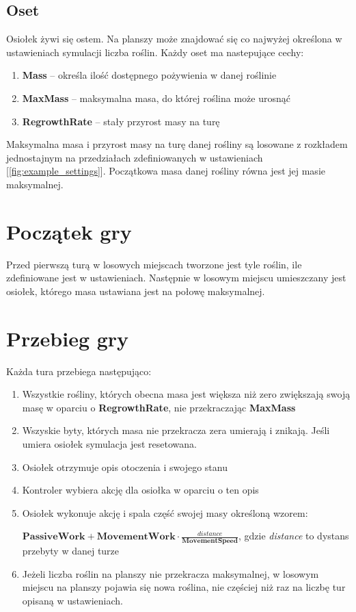 \subsection{Oset}
Osiołek żywi się ostem. Na planszy może znajdować się co najwyżej określona w ustawieniach symulacji liczba roślin. Każdy oset ma nastepujące cechy:
\begin{enumerate}    
    \item \textbf{Mass} -- określa ilość dostępnego pożywienia w danej roślinie
    \item \textbf{MaxMass} -- maksymalna masa, do której roślina może urosnąć
    \item \textbf{RegrowthRate} -- stały przyrost masy na turę
\end{enumerate}
Maksymalna masa i przyrost masy na turę danej rośliny są losowane z rozkładem jednostajnym na przedziałach zdefiniowanych w ustawieniach [\ref{fig:example_settings}]. Początkowa masa danej rośliny równa jest jej masie maksymalnej.

\section{Początek gry}
Przed pierwszą turą w losowych miejscach tworzone jest tyle roślin, ile zdefiniowane jest w ustawieniach. Następnie w losowym miejscu umieszczany jest osiołek, którego masa ustawiana jest na połowę maksymalnej.

\section{Przebieg gry}
Każda tura przebiega następująco:
\begin{enumerate}    
    \item Wszystkie rośliny, których obecna masa jest większa niż zero zwiększają swoją masę w oparciu o \textbf{RegrowthRate}, nie przekraczając \textbf{MaxMass}
    \item Wszyskie byty, których masa nie przekracza zera umierają i znikają. Jeśli umiera osiołek symulacja jest resetowana.
    \item Osiołek otrzymuje opis otoczenia i swojego stanu
    \item Kontroler wybiera akcję dla osiołka w oparciu o ten opis
    \item Osiołek wykonuje akcję i spala część swojej masy określoną wzorem:

     $\textbf{PassiveWork} + \textbf{MovementWork} \cdot \frac{\textit{distance}}{\textbf{MovementSpeed}}$, gdzie \textit{distance} to dystans przebyty w danej turze
    \item Jeżeli liczba roślin na planszy nie przekracza maksymalnej, w losowym miejscu na planszy pojawia się nowa roślina, nie częściej niż raz na liczbę tur opisaną w ustawieniach.
\end{enumerate}

